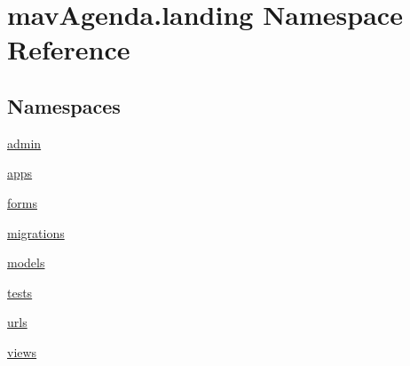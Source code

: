 \hypertarget{namespacemavAgenda_1_1landing}{}\section{mav\+Agenda.\+landing Namespace Reference}
\label{namespacemavAgenda_1_1landing}
\subsection*{Namespaces}
\begin{DoxyCompactItemize}
\item 
 \mbox{\hyperlink{namespacemavAgenda_1_1landing_1_1admin}{admin}}
\item 
 \mbox{\hyperlink{namespacemavAgenda_1_1landing_1_1apps}{apps}}
\item 
 \mbox{\hyperlink{namespacemavAgenda_1_1landing_1_1forms}{forms}}
\item 
 \mbox{\hyperlink{namespacemavAgenda_1_1landing_1_1migrations}{migrations}}
\item 
 \mbox{\hyperlink{namespacemavAgenda_1_1landing_1_1models}{models}}
\item 
 \mbox{\hyperlink{namespacemavAgenda_1_1landing_1_1tests}{tests}}
\item 
 \mbox{\hyperlink{namespacemavAgenda_1_1landing_1_1urls}{urls}}
\item 
 \mbox{\hyperlink{namespacemavAgenda_1_1landing_1_1views}{views}}
\end{DoxyCompactItemize}
